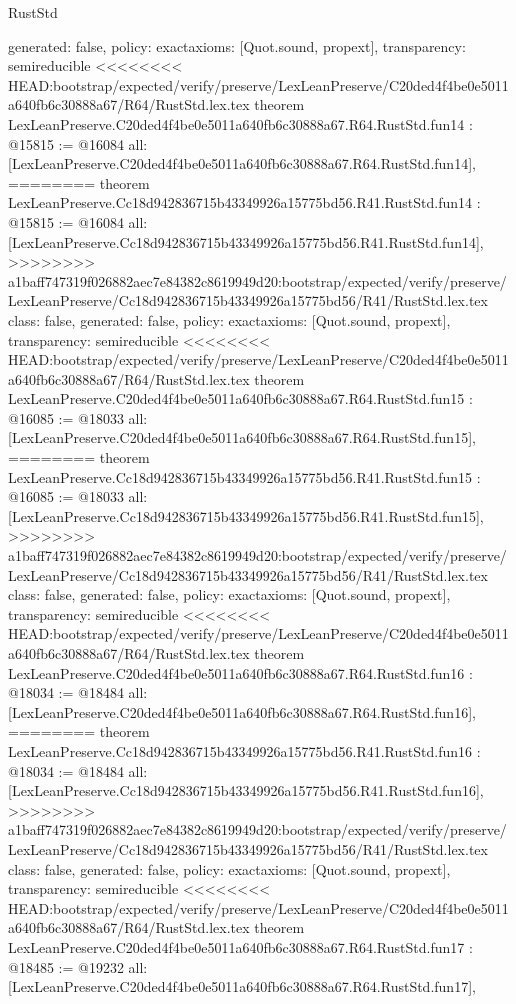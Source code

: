 \begin{lexlean}{RustStd}
\begin{coremodule}
{\begin{coremodule}
{{{{{{{{{{{{{{{{{  generated: false,
  policy: exact{axioms: [Quot.sound, propext]},
  transparency: semireducible
}
<<<<<<<< HEAD:bootstrap/expected/verify/preserve/LexLeanPreserve/C20ded4f4be0e5011a640fb6c30888a67/R64/RustStd.lex.tex
theorem LexLeanPreserve.C20ded4f4be0e5011a640fb6c30888a67.R64.RustStd.fun14 : @15815 := @16084 {
  all: [LexLeanPreserve.C20ded4f4be0e5011a640fb6c30888a67.R64.RustStd.fun14],
========
theorem LexLeanPreserve.Cc18d942836715b43349926a15775bd56.R41.RustStd.fun14 : @15815 := @16084 {
  all: [LexLeanPreserve.Cc18d942836715b43349926a15775bd56.R41.RustStd.fun14],
>>>>>>>> a1baff747319f026882aec7e84382c8619949d20:bootstrap/expected/verify/preserve/LexLeanPreserve/Cc18d942836715b43349926a15775bd56/R41/RustStd.lex.tex
  class: false,
  generated: false,
  policy: exact{axioms: [Quot.sound, propext]},
  transparency: semireducible
}
<<<<<<<< HEAD:bootstrap/expected/verify/preserve/LexLeanPreserve/C20ded4f4be0e5011a640fb6c30888a67/R64/RustStd.lex.tex
theorem LexLeanPreserve.C20ded4f4be0e5011a640fb6c30888a67.R64.RustStd.fun15 : @16085 := @18033 {
  all: [LexLeanPreserve.C20ded4f4be0e5011a640fb6c30888a67.R64.RustStd.fun15],
========
theorem LexLeanPreserve.Cc18d942836715b43349926a15775bd56.R41.RustStd.fun15 : @16085 := @18033 {
  all: [LexLeanPreserve.Cc18d942836715b43349926a15775bd56.R41.RustStd.fun15],
>>>>>>>> a1baff747319f026882aec7e84382c8619949d20:bootstrap/expected/verify/preserve/LexLeanPreserve/Cc18d942836715b43349926a15775bd56/R41/RustStd.lex.tex
  class: false,
  generated: false,
  policy: exact{axioms: [Quot.sound, propext]},
  transparency: semireducible
}
<<<<<<<< HEAD:bootstrap/expected/verify/preserve/LexLeanPreserve/C20ded4f4be0e5011a640fb6c30888a67/R64/RustStd.lex.tex
theorem LexLeanPreserve.C20ded4f4be0e5011a640fb6c30888a67.R64.RustStd.fun16 : @18034 := @18484 {
  all: [LexLeanPreserve.C20ded4f4be0e5011a640fb6c30888a67.R64.RustStd.fun16],
========
theorem LexLeanPreserve.Cc18d942836715b43349926a15775bd56.R41.RustStd.fun16 : @18034 := @18484 {
  all: [LexLeanPreserve.Cc18d942836715b43349926a15775bd56.R41.RustStd.fun16],
>>>>>>>> a1baff747319f026882aec7e84382c8619949d20:bootstrap/expected/verify/preserve/LexLeanPreserve/Cc18d942836715b43349926a15775bd56/R41/RustStd.lex.tex
  class: false,
  generated: false,
  policy: exact{axioms: [Quot.sound, propext]},
  transparency: semireducible
}
<<<<<<<< HEAD:bootstrap/expected/verify/preserve/LexLeanPreserve/C20ded4f4be0e5011a640fb6c30888a67/R64/RustStd.lex.tex
theorem LexLeanPreserve.C20ded4f4be0e5011a640fb6c30888a67.R64.RustStd.fun17 : @18485 := @19232 {
  all: [LexLeanPreserve.C20ded4f4be0e5011a640fb6c30888a67.R64.RustStd.fun17],
}}}}}}}}}}}}}}}}}}}}
\end{coremodule}}
\end{coremodule}
\end{lexlean}
